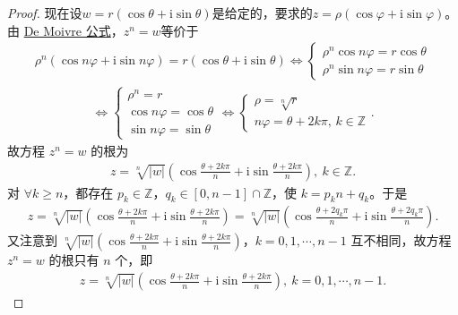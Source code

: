 \documentclass[../../main.tex]{subfiles}%
\begin{document}
\begin{proof}

现在设\(w = r(\cos\theta + \mathrm{i}\sin\theta)\)是给定的，要求的\(z = \rho(\cos\varphi + \mathrm{i}\sin\varphi)\)。由 \hyperref[theorem:De Moivre公式]{De Moivre 公式}，\(z^n = w\)等价于
\begin{align*}
\rho^n(\cos n\varphi + \mathrm{i}\sin n\varphi) = r(\cos \theta + \mathrm{i}\sin \theta)
\Longleftrightarrow
\begin{cases}
\rho^n\cos n\varphi = r\cos \theta \\
\rho^n\sin n\varphi = r\sin \theta
\end{cases}
\end{align*}
\begin{align*}
\Longleftrightarrow
\begin{cases}
\rho^n = r \\
\cos n\varphi = \cos \theta \\
\sin n\varphi = \sin \theta
\end{cases}
\Longleftrightarrow
\begin{cases}
\rho = \sqrt[n]{r} \\
n\varphi = \theta + 2k\pi,\, k\in \mathbb{Z}
\end{cases}.
\end{align*}
故方程 $z^n = w$ 的根为
\begin{align*}
z = \sqrt[n]{|w|}\left( \cos \frac{\theta + 2k\pi}{n} + \mathrm{i}\sin \frac{\theta + 2k\pi}{n} \right),\ k\in \mathbb{Z}.
\end{align*}
对 $\forall k \geq n$，都存在 $p_k \in \mathbb{Z}$，$q_k \in [0,n-1] \cap \mathbb{Z}$，使 $k = p_kn + q_k$。于是
\begin{align*}
z = \sqrt[n]{|w|}\left( \cos \frac{\theta + 2k\pi}{n} + \mathrm{i}\sin \frac{\theta + 2k\pi}{n} \right) = \sqrt[n]{|w|}\left( \cos \frac{\theta + 2q_k\pi}{n} + \mathrm{i}\sin \frac{\theta + 2q_k\pi}{n} \right).
\end{align*}
又注意到 $\sqrt[n]{|w|}\left( \cos \frac{\theta + 2k\pi}{n} + \mathrm{i}\sin \frac{\theta + 2k\pi}{n} \right)$，$k=0,1,\cdots,n-1$ 互不相同，故方程 $z^n = w$ 的根只有 $n$ 个，即
\begin{align*}
z = \sqrt[n]{|w|}\left( \cos \frac{\theta + 2k\pi}{n} + \mathrm{i}\sin \frac{\theta + 2k\pi}{n} \right),\ k=0,1,\cdots,n-1.
\end{align*}


\end{proof}
\end{document}
